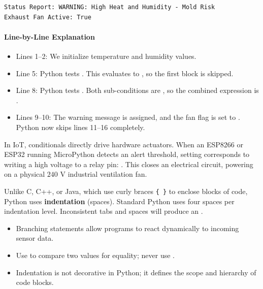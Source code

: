 \begin{lstlisting}[style=outputstyle]
Status Report: WARNING: High Heat and Humidity - Mold Risk
Exhaust Fan Active: True
\end{lstlisting}

\paragraph{Line-by-Line Explanation}
\begin{itemize}
    \item Lines 1--2: We initialize temperature and humidity values.
    \item Line 5: Python tests . This evaluates to , so the first block is skipped.
    \item Line 8: Python tests . Both sub-conditions are , so the combined expression is .
    \item Lines 9--10: The warning message is assigned, and the fan flag is set to . Python now skips lines 11--16 completely.
\end{itemize}

\begin{iotbox}
In IoT, conditionals directly drive hardware actuators. When an ESP8266 or ESP32 running MicroPython detects an alert threshold, setting  corresponds to writing a high voltage to a relay pin: . This closes an electrical circuit, powering on a physical $240\text{ V}$ industrial ventilation fan.
\end{iotbox}

\begin{warning}
Unlike C, C++, or Java, which use curly braces \texttt{\{ \}} to enclose blocks of code, Python uses \textbf{indentation} (spaces). Standard Python uses four spaces per indentation level. Inconsistent tabs and spaces will produce an .
\end{warning}

\begin{takeaways}
\begin{itemize}
    \item Branching statements allow programs to react dynamically to incoming sensor data.
    \item Use \code{==} to compare two values for equality; never use \code{=}.
    \item Indentation is not decorative in Python; it defines the scope and hierarchy of code blocks.
\end{itemize}
\end{takeaways}

